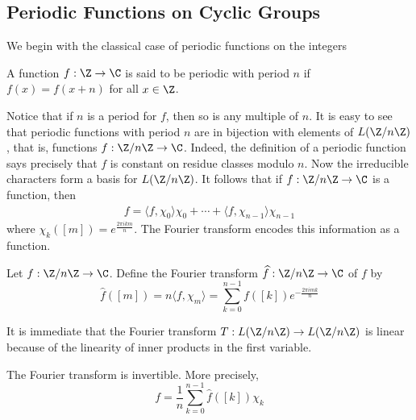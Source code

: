 \subsection{Periodic Functions on Cyclic Groups}
We begin with the classical case of periodic functions on the integers
\begin{definition}
A function $f:\Z\to\C$ is said to be periodic with period $n$ if $f(x)=f(x+n)$ for all $x\in\Z$.
\end{definition}
Notice that if $n$ is a period for $f$, then so is any multiple of $n$. It is easy to see that periodic functions with period $n$ are in bijection with elements of $L(\Z/n\Z)$, that is, functions $f:\Z/n\Z\to\C$. Indeed, the definition of a periodic function says precisely that $f$ is constant on residue classes modulo $n$. Now the irreducible characters form a basis for $L(\Z/n\Z)$. It follows that if $f:\Z/n\Z\to\C$ is a function, then
\begin{align*}\label{Fourier fini group-1}
f=\langle f,\chi_0\rangle\chi_0+\cdots+\langle f,\chi_{n-1}\rangle\chi_{n-1}
\end{align*}
where $\chi_k([m])=e^{\frac{2\pi ikm}{n}}$. The Fourier transform encodes this information as a function.
\begin{definition}
Let $f:\Z/n\Z\to\C$. Define the Fourier transform $\widehat{f}:\Z/n\Z\to\C$ of $f$ by
\[\widehat{f}([m])=n\langle f,\chi_m\rangle=\sum_{k=0}^{n-1}f([k])e^{-\frac{2\pi imk}{n}}\]
\end{definition}
It is immediate that the Fourier transform $T:L(\Z/n\Z)\to L(\Z/n\Z)$ is linear because of the linearity of inner products in the first variable.
\begin{proposition}
The Fourier transform is invertible. More precisely,
\[f=\frac{1}{n}\sum_{k=0}^{n-1}\widehat{f}([k])\chi_k\]
\end{proposition}
